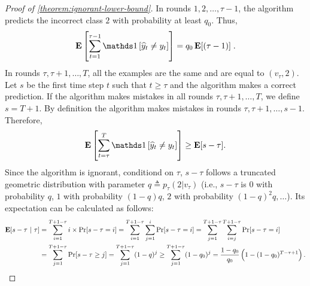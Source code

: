 \begin{proof}[Proof of \autoref{theorem:ignorant-lower-bound}]
In rounds $1,2,\dots,\tau-1$, the algorithm predicts the incorrect class $2$
with probability at least $q_0$. Thus,
$$
\Exp\left[\sum_{t=1}^{\tau - 1} \indicator{\widehat y_t\neq y_t}\right] = q_0 \Exp[(\tau - 1)] \; .
$$
In rounds $\tau, \tau+1, \dots, T$, all the examples are the same and are equal
to $(v_\tau, 2)$. Let $s$ be the first time step $t$ such that $t \ge \tau$
and the algorithm makes a correct prediction. If the algorithm makes mistakes
in all rounds $\tau, \tau+1, \dots, T$, we define $s = T+1$.
By definition the algorithm makes mistakes in rounds $\tau, \tau+1, \dots, s-1$.
Therefore,
$$
\Exp\left[\sum_{t=\tau}^T \indicator{\widehat y_t\neq y_t}\right] \ge \Exp[s-\tau].
$$
Since the algorithm is ignorant, conditiond on $\tau$, $s-\tau$ follows a truncated 
geometric distribution with parameter $q\triangleq p_\tau(2|v_\tau)$
(i.e., $s-\tau$ is $0$ with probability $q$, $1$ with probability $(1-q)q$, $2$ with probability $(1-q)^2q, \ldots$). Its expectation can be calculated as follows: 
\begin{align*}
\operatorname*{\mathbf{E}}[s-\tau~|~\tau] 
&= \sum_{i=1}^{T+1-\tau} i\times  \Pr[s-\tau=i]= \sum_{i=1}^{T+1-\tau}\sum_{j=1}^i \Pr[s-\tau=i] = \sum_{j=1}^{T+1-\tau}\sum_{i=j}^{T+1-\tau} \Pr[s-\tau=i] \\
&= \sum_{j=1}^{T+1-\tau}\Pr[s-\tau\geq j] = \sum_{j=1}^{T+1-\tau}(1-q)^j \geq  \sum_{j=1}^{T+1-\tau}(1-q_0)^j = \frac{1-q_0}{q_0}\left( 1-(1-q_0)^{T-\tau+1} \right). 
\end{align*}








\end{proof}
